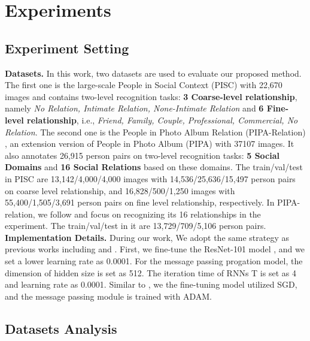\documentclass{article}
\begin{document}
\section{Experiments}

\subsection{Experiment Setting}

{\bf Datasets.} In this work, two datasets are used to evaluate our proposed method. The first one is the large-scale People in Social Context (PISC) \cite{DBLP:conf/iccv/LiWZK17} with 22,670 images and contains two-level recognition tasks: {\bf 3 Coarse-level relationship}, namely {\it No Relation, Intimate Relation, None-Intimate Relation} and {\bf 6 Fine-level relationship}, i.e., {\it Friend, Family, Couple, Professional, Commercial, No Relation}. The second one is the People in Photo Album Relation (PIPA-Relation) \cite{DBLP:conf/cvpr/SunSF17}, an extension version of People in Photo Album (PIPA) \cite{DBLP:conf/cvpr/ZhangPTFB15} with 37107 images. It also annotates 26,915 person pairs on two-level recognition tasks: {\bf 5 Social Domains} and {\bf 16 Social Relations} based on these domains. The train/val/test in PISC are 13,142/4,000/4,000 images with 14,536/25,636/15,497 person pairs on coarse level relationship, and 16,828/500/1,250 images with 55,400/1,505/3,691 person pairs on fine level relationship, respectively. In PIPA-relation, we follow \cite{DBLP:conf/ijcai/WangCRYCL18} and focus on recognizing its 16 relationships in the experiment. The train/val/test in it are 13,729/709/5,106 person pairs. \\
{\bf Implementation Details.} During our work, We adopt the same strategy as previous works including \cite{DBLP:conf/iccv/LiWZK17} and \cite{DBLP:conf/ijcai/WangCRYCL18}. First, we fine-tune the ResNet-101 model \cite{DBLP:conf/cvpr/HeZRS16} , and we set a lower learning rate as 0.0001. For the message passing progation model, the dimension of hidden size is set as 512. The iteration time of RNNs T is set as 4 and learning rate as 0.0001. Similar to \cite{DBLP:conf/ijcai/WangCRYCL18}, we the fine-tuning model utilized SGD, and the message passing module is trained with ADAM.

\subsection{Datasets Analysis}\label{section:dataset_anaysis}
\end{document}
